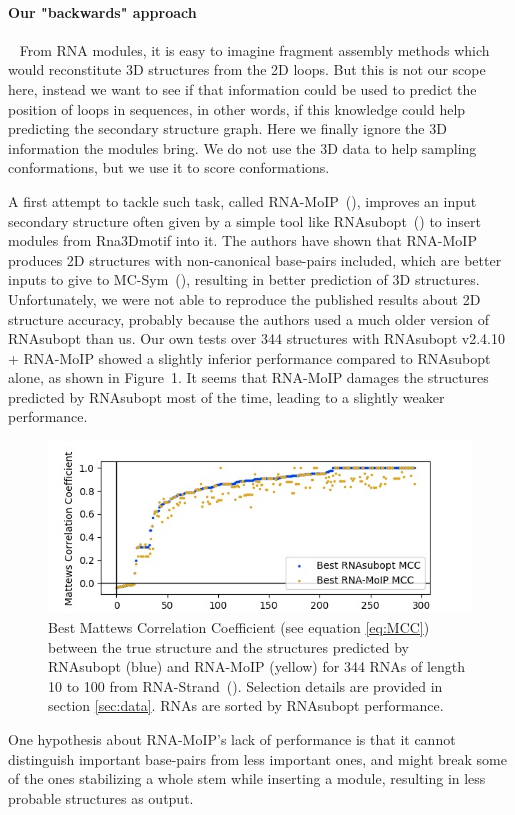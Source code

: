 \documentclass{bioinfo}
\begin{document}
\paragraph{Our "backwards" approach} ~ From RNA modules, it is easy to imagine fragment assembly methods which would reconstitute 3D structures from the 2D loops. But this is not our scope here, instead we want to see if that information could be used to predict the position of loops in sequences, in other words, if this knowledge could help predicting the secondary structure graph. Here we finally ignore the 3D information the modules bring. We do not use the 3D data to help sampling conformations, but we use it to score conformations. 

A first attempt to tackle such task, called RNA-MoIP~(\citealp{reinharz_towards_2012}), improves an input secondary structure often given by a simple tool like RNAsubopt~(\citealp{lorenz_viennarna_2011}) to insert modules from Rna3Dmotif into it. The authors have shown that RNA-MoIP produces 2D structures with non-canonical base-pairs included, which are better inputs to give to MC-Sym~(\citealp{parisien2008mc}), resulting in better prediction of 3D structures. Unfortunately, we were not able to reproduce the published results about 2D structure accuracy, probably because the authors used a much older version of RNAsubopt than us. Our own tests over 344 structures with RNAsubopt v2.4.10 + RNA-MoIP showed a slightly inferior performance compared to RNAsubopt alone, as shown in Figure~1\vphantom{\ref{fig:comparison}}. It seems that RNA-MoIP damages the structures predicted by RNAsubopt most of the time, leading to a slightly weaker performance. 
\begin{figure}[!tpb]
\centerline{\includegraphics[width=\linewidth]{fig/Figure_1.jpg}} 
\caption{Best Mattews Correlation Coefficient (see equation \ref{eq:MCC}) between the true structure and the structures predicted by RNAsubopt (blue) and RNA-MoIP (yellow) for 344 RNAs of length 10 to 100 from RNA-Strand~(\citealp{andronescu2008rna}). Selection details are provided in section \ref{sec:data}. RNAs are sorted by RNAsubopt performance.}\label{fig:comparison}
\end{figure}
One hypothesis about RNA-MoIP's lack of performance is that it cannot distinguish important base-pairs from less important ones, and might break some of the ones stabilizing a whole stem while inserting a module, resulting in less probable structures as output. 
\end{document}
